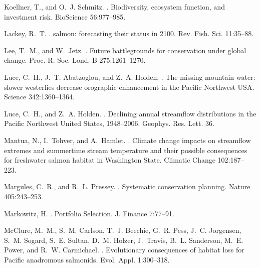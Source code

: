 \documentclass[12pt,english]{article}
\begin{document}
\begin{spacing}{1.9}
\begin{thebibliography}{64}
Koellner, T., and O.~J. Schmitz.
.
\newblock Biodiversity, ecosystem function, and investment risk.
\newblock BioScience 56:977--985.

Lackey, R.~T.
.
 salmon: forecasting their status in 2100.
\newblock Rev. Fish. Sci. 11:35--88.

Lee, T.~M., and W.~Jetz.
.
\newblock Future battlegrounds for conservation under global change.
\newblock Proc. R. Soc. Lond. B 275:1261--1270.

Luce, C.~H., J.~T. Abatzoglou, and Z.~A. Holden.
.
\newblock The missing mountain water: slower westerlies decrease orographic
  enhancement in the {Pacific Northwest USA}.
\newblock Science 342:1360--1364.

Luce, C.~H., and Z.~A. Holden.
.
\newblock Declining annual streamflow distributions in the {Pacific Northwest
  United States}, 1948--2006.
\newblock Geophys. Res. Lett. 36.

Mantua, N., I.~Tohver, and A.~Hamlet.
.
\newblock Climate change impacts on streamflow extremes and summertime stream
  temperature and their possible consequences for freshwater salmon habitat in
  {Washington State}.
\newblock Climatic Change 102:187--223.

Margules, C.~R., and R.~L. Pressey.
.
\newblock Systematic conservation planning.
\newblock Nature 405:243--253.

Markowitz, H.
.
\newblock Portfolio Selection.
\newblock J. Finance 7:77--91.

McClure, M.~M., S.~M. Carlson, T.~J. Beechie, G.~R. Pess, J.~C. Jorgensen,
  S.~M. Sogard, S.~E. Sultan, D.~M. Holzer, J.~Travis, B.~L. Sanderson, M.~E.
  Power, and R.~W. Carmichael.
.
\newblock Evolutionary consequences of habitat loss for {Pacific} anadromous
  salmonids.
\newblock Evol. Appl. 1:300--318.


\end{thebibliography}
\end{spacing}
\end{document}
